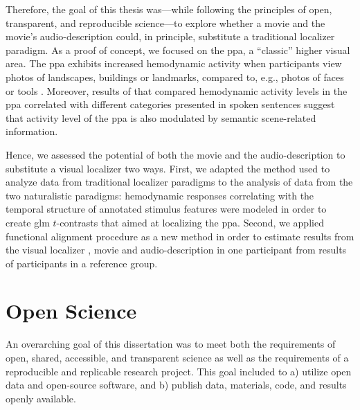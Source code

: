 Therefore, the goal of this thesis was---while following the principles of open,
transparent, and reproducible science---to explore whether a movie and the
movie's audio-description could, in principle, substitute a traditional
localizer paradigm.
As a proof of concept, we focused on the \ac{ppa}, a ``classic'' higher visual
area.
%
The \ac{ppa} exhibits increased hemodynamic activity when participants view
photos of landscapes, buildings or landmarks, compared to, e.g., photos of faces
or tools \citep[e.g.,][for reviews]{epstein2014neural, aminoff2013role}.
%
Moreover, results of \citep{aziz2008modulation} that compared hemodynamic
activity levels in the \ac{ppa} correlated with different categories presented
in spoken sentences suggest that activity level of the \ac{ppa} is also
modulated by semantic scene-related information.

%
Hence, we assessed the potential of both the movie and the audio-description
to substitute a visual localizer two ways.
First, we adapted the method used to analyze data from traditional localizer
paradigms to the analysis of data from the two naturalistic paradigms:
%
hemodynamic responses correlating with the temporal structure of annotated
stimulus features \citep[cf.][]{haeusler2016cutanno, haeusler2021speechanno}
were modeled in order to create \ac{glm} $t$-contrasts that aimed at localizing
the \ac{ppa}.
Second, we applied functional alignment procedure as a new method in order to
estimate results from the visual localizer \citep[cf.][]{sengupta2016extension},
movie and audio-description \citep[cf.][]{haeusler2022processing} in one
participant from results of participants in a reference group.


\pagebreak


\section{Open Science}



%
An overarching goal of this dissertation was to meet both the requirements of
open, shared, accessible, and transparent science \citep[cf.][]{watson2015will,
fecher2014open} as well as the requirements of a reproducible and replicable
research project. This goal included to a) utilize open data and open-source
software, and b) publish data, materials, code, and results openly available.



